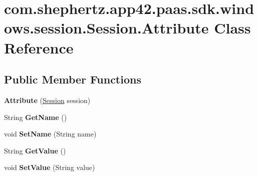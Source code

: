 \hypertarget{classcom_1_1shephertz_1_1app42_1_1paas_1_1sdk_1_1windows_1_1session_1_1_session_1_1_attribute}{\section{com.\+shephertz.\+app42.\+paas.\+sdk.\+windows.\+session.\+Session.\+Attribute Class Reference}
\label{classcom_1_1shephertz_1_1app42_1_1paas_1_1sdk_1_1windows_1_1session_1_1_session_1_1_attribute}
}
\subsection*{Public Member Functions}
\begin{DoxyCompactItemize}
\item 
\hypertarget{classcom_1_1shephertz_1_1app42_1_1paas_1_1sdk_1_1windows_1_1session_1_1_session_1_1_attribute_af9387910d1cdf8422af68e4b0ac6a32c}{{\bfseries Attribute} (\hyperlink{classcom_1_1shephertz_1_1app42_1_1paas_1_1sdk_1_1windows_1_1session_1_1_session}{Session} session)}\label{classcom_1_1shephertz_1_1app42_1_1paas_1_1sdk_1_1windows_1_1session_1_1_session_1_1_attribute_af9387910d1cdf8422af68e4b0ac6a32c}

\item 
\hypertarget{classcom_1_1shephertz_1_1app42_1_1paas_1_1sdk_1_1windows_1_1session_1_1_session_1_1_attribute_ad92cdd2eb479bcf19860f935659c7d1b}{String {\bfseries Get\+Name} ()}\label{classcom_1_1shephertz_1_1app42_1_1paas_1_1sdk_1_1windows_1_1session_1_1_session_1_1_attribute_ad92cdd2eb479bcf19860f935659c7d1b}

\item 
\hypertarget{classcom_1_1shephertz_1_1app42_1_1paas_1_1sdk_1_1windows_1_1session_1_1_session_1_1_attribute_a6624c9330dca253b9182cfe87264b0f8}{void {\bfseries Set\+Name} (String name)}\label{classcom_1_1shephertz_1_1app42_1_1paas_1_1sdk_1_1windows_1_1session_1_1_session_1_1_attribute_a6624c9330dca253b9182cfe87264b0f8}

\item 
\hypertarget{classcom_1_1shephertz_1_1app42_1_1paas_1_1sdk_1_1windows_1_1session_1_1_session_1_1_attribute_ad9646b5767188cfc0ac942982667e3fd}{String {\bfseries Get\+Value} ()}\label{classcom_1_1shephertz_1_1app42_1_1paas_1_1sdk_1_1windows_1_1session_1_1_session_1_1_attribute_ad9646b5767188cfc0ac942982667e3fd}

\item 
\hypertarget{classcom_1_1shephertz_1_1app42_1_1paas_1_1sdk_1_1windows_1_1session_1_1_session_1_1_attribute_ad512598363475298688c3798605bbb16}{void {\bfseries Set\+Value} (String value)}\label{classcom_1_1shephertz_1_1app42_1_1paas_1_1sdk_1_1windows_1_1session_1_1_session_1_1_attribute_ad512598363475298688c3798605bbb16}

\end{DoxyCompactItemize}
